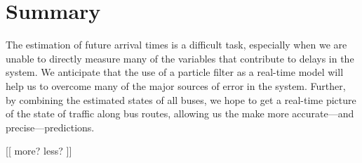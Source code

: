 \documentclass[12pt,a4paper]{article}
\newcommand{\pf}{particle filter}
\begin{document}
\section{Summary}





The estimation of future arrival times is a difficult task,
especially when we are unable to directly measure many of the 
variables that contribute to delays in the system.
We anticipate that the use of a \pf{} as a real-time model will
help us to overcome many of the major sources of error in the system.
Further, by combining the estimated states of all buses,
we hope to get a real-time picture of the state of traffic along bus routes,
allowing us the make more accurate---and precise---predictions.

[[ more? less? ]]














\end{document}

